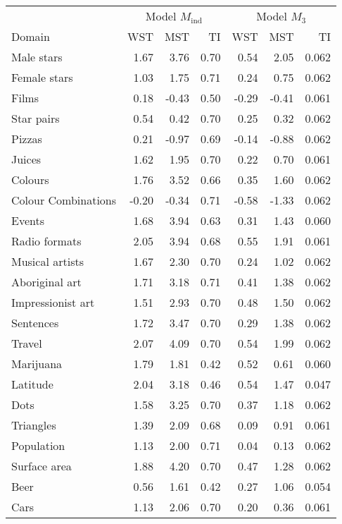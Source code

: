 
\begin{tabular}[t]{lrrrrrr}
\toprule
\multicolumn{1}{c}{ } & \multicolumn{3}{c}{Model $M_{\mathrm{ind}}$} & \multicolumn{3}{c}{Model $M_3$} \\
\cmidrule(l{3pt}r{3pt}){2-4} \cmidrule(l{3pt}r{3pt}){5-7}
Domain & WST & MST & TI & WST & MST & TI\\
\midrule
Male stars & 1.67 & 3.76 & 0.70 & 0.54 & 2.05 & 0.062\\
Female stars & 1.03 & 1.75 & 0.71 & 0.24 & 0.75 & 0.062\\
Films & 0.18 & -0.43 & 0.50 & -0.29 & -0.41 & 0.061\\
Star pairs & 0.54 & 0.42 & 0.70 & 0.25 & 0.32 & 0.062\\
Pizzas & 0.21 & -0.97 & 0.69 & -0.14 & -0.88 & 0.062\\
\addlinespace
Juices & 1.62 & 1.95 & 0.70 & 0.22 & 0.70 & 0.061\\
Colours & 1.76 & 3.52 & 0.66 & 0.35 & 1.60 & 0.062\\
Colour Combinations & -0.20 & -0.34 & 0.71 & -0.58 & -1.33 & 0.062\\
Events & 1.68 & 3.94 & 0.63 & 0.31 & 1.43 & 0.060\\
Radio formats & 2.05 & 3.94 & 0.68 & 0.55 & 1.91 & 0.061\\
\addlinespace
Musical artists & 1.67 & 2.30 & 0.70 & 0.24 & 1.02 & 0.062\\
Aboriginal art & 1.71 & 3.18 & 0.71 & 0.41 & 1.38 & 0.062\\
Impressionist art & 1.51 & 2.93 & 0.70 & 0.48 & 1.50 & 0.062\\
Sentences & 1.72 & 3.47 & 0.70 & 0.29 & 1.38 & 0.062\\
Travel & 2.07 & 4.09 & 0.70 & 0.54 & 1.99 & 0.062\\
\addlinespace
Marijuana & 1.79 & 1.81 & 0.42 & 0.52 & 0.61 & 0.060\\
Latitude & 2.04 & 3.18 & 0.46 & 0.54 & 1.47 & 0.047\\
Dots & 1.58 & 3.25 & 0.70 & 0.37 & 1.18 & 0.062\\
Triangles & 1.39 & 2.09 & 0.68 & 0.09 & 0.91 & 0.061\\
Population & 1.13 & 2.00 & 0.71 & 0.04 & 0.13 & 0.062\\
\addlinespace
Surface area & 1.88 & 4.20 & 0.70 & 0.47 & 1.28 & 0.062\\
Beer & 0.56 & 1.61 & 0.42 & 0.27 & 1.06 & 0.054\\
Cars & 1.13 & 2.06 & 0.70 & 0.20 & 0.36 & 0.061\\

\end{tabular}
